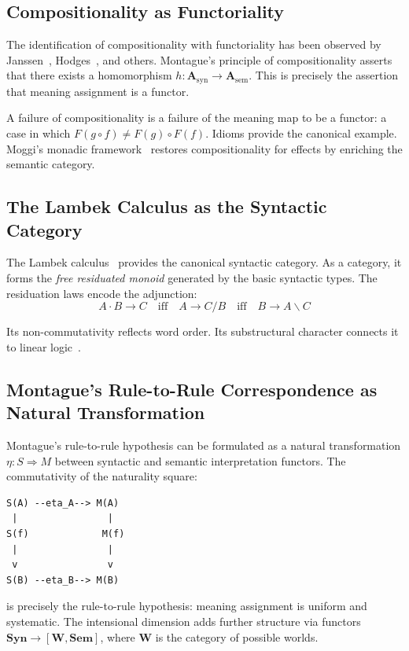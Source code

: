 \documentclass[12pt,a4paper]{article}
\begin{document}
\subsection{Compositionality as Functoriality}

The identification of compositionality with functoriality has been observed
by Janssen~\cite{Janssen1997}, Hodges~\cite{Hodges2001}, and others.
Montague's principle of compositionality asserts that there exists a
homomorphism $h \colon \mathbf{A}_{\mathrm{syn}} \to
\mathbf{A}_{\mathrm{sem}}$. This is precisely the assertion that meaning
assignment is a functor.

A failure of compositionality is a failure of the meaning map to be a
functor: a case in which $F(g \circ f) \neq F(g) \circ F(f)$. Idioms
provide the canonical example. Moggi's monadic
framework~\cite{Moggi1991} restores compositionality for effects by enriching
the semantic category.

\subsection{The Lambek Calculus as the Syntactic Category}

The Lambek calculus~\cite{Lambek1958} provides the canonical syntactic
category. As a category, it forms the \emph{free residuated monoid} generated
by the basic syntactic types. The residuation laws encode the adjunction:
\[
A \cdot B \to C \quad\text{iff}\quad A \to C / B \quad\text{iff}\quad B \to A \backslash C
\]

Its non-commutativity reflects word order. Its substructural character
connects it to linear logic~\cite{Girard1987}.

\subsection{Montague's Rule-to-Rule Correspondence as Natural Transformation}

Montague's rule-to-rule hypothesis can be formulated as a natural
transformation $\eta \colon S \Rightarrow M$ between syntactic and semantic
interpretation functors. The commutativity of the naturality square:

\begin{verbatim}
S(A) --eta_A--> M(A)
 |                |
S(f)             M(f)
 |                |
 v                v
S(B) --eta_B--> M(B)
\end{verbatim}

\noindent is precisely the rule-to-rule hypothesis: meaning assignment is
uniform and systematic. The intensional dimension adds further structure via
functors $\mathbf{Syn} \to [\mathbf{W}, \mathbf{Sem}]$, where $\mathbf{W}$ is
the category of possible worlds.
\end{document}
